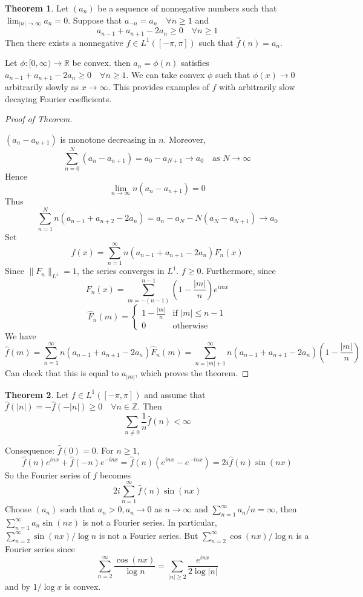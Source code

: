 \documentclass{article}
\theoremstyle{definition}
\newtheorem{thm}{Theorem}
\newenvironment{proofs}[1][\proofname]{%
  \begin{proof}[#1]$ $\par\nobreak\ignorespaces
}{%
  \end{proof}
}
\newcommand{\RR}{\mathbb R}
\newcommand{\ZZ}{\mathbb Z}
\begin{document}
\begin{thm}
	Let $(a_n)$ be a sequence of nonnegative numbers such that $\lim_{|n| \to \infty} a_n = 0$.
	Suppose that $a_{-n} = a_n \quad \forall n \geq 1$ and 
	\[
		a_{n - 1} + a_{n + 1} - 2 a_n \geq 0 \quad \forall n \geq 1
	\]
	Then there exists a nonnegative $f \in L^1([-\pi, \pi])$ such that $\hat{f}(n) = a_n$.
\end{thm}

Let $\phi:[0, \infty) \to \RR$ be convex.
then $a_n = \phi(n)$ satisfies $a_{n - 1} + a_{n + 1} - 2 a_n \geq 0 \quad \forall n \geq 1$.
We can take convex $\phi$ such that $\phi(x) \to 0$ arbitrarily slowly as $x \to \infty$.
This provides examples of $f$ with arbitrarily slow decaying Fourier coefficients.

\begin{proofs}[Proof of Theorem]
	$(a_n - a_{n + 1})$ is monotone decreasing in $n$.
	Moreover, 
	\[
		\sum_{n = 0}^N (a_n - a_{n + 1}) = a_0 - a_{N + 1} \to a_0 \quad \text{as } N \to \infty
	\]
	Hence 
	\[
		\lim_{n \to \infty} n(a_n - a_{n + 1}) = 0
	\]
	Thus 
	\[
		\sum_{n = 1}^N n(a_{n - 1} + a_{n + 2} - 2 a_n) = a_n - a_N - N (a_N - a_{N + 1}) \to a_0
	\]
	Set 
	\[
		f(x) = \sum_{n = 1}^\infty n(a_{n - 1} + a_{n + 1} - 2 a_n) F_n(x)
	\]
	Since $\|F_n\|_{L^1} = 1$, the series converges in $L^1$.
	$f \geq 0$.
	Furthermore, since
	\[
		F_n(x) = \sum_{m = -(n - 1)}^{n - 1} \left(1 - \frac{|m|}{n} \right) e^{imx}
	\]
	\[
		\hat{F}_n(m) = 
		\begin{cases}
			1 - \frac{|m|}{n} &\text{if } |m| \leq n - 1\\
			0 & \text{otherwise}
		\end{cases}
	\]
	We have
	\[
		\hat{f}(m) = \sum_{n = 1}^\infty n(a_{n - 1} + a_{n + 1} - 2 a_n) \hat{F}_n(m) = \sum_{n = |m| + 1}^\infty n(a_{n - 1} + a_{n + 1} - 2 a_n) \left( 1 - \frac{|m|}{n} \right)
	\]
	Can check that this is equal to $a_{|m|}$, which proves the theorem.
\end{proofs}

\begin{thm}
	Let $f \in L^1([-\pi, \pi])$ and assume that $\hat{f}(|n|) = -\hat{f}(-|n|) \geq 0 \quad \forall n \in \ZZ$.
	Then 
	\[
		\sum_{n \neq 0} \frac{1}{n} \hat{f}(n) < \infty
	\]
\end{thm}

Consequence: $\hat{f}(0) = 0$.
For $n \geq 1$, 
\[
	\hat{f}(n) e^{inx} + \hat{f}(-n) e^{-inx} = \hat{f}(n) (e^{inx} - e^{-inx}) = 2i \hat{f}(n) \sin (nx)
\]
So the Fourier series of $f$ becomes
\[
	2 i \sum_{n = 1}^\infty \hat{f}(n) \sin (nx)
\]
Choose $(a_n)$ such that $a_n > 0, a_n \to 0$ as $n \to \infty$ and $\sum_{n = 1}^\infty a_n/n = \infty$, then $\sum_{n = 1}^\infty a_n \sin (nx)$ is not a Fourier series.
In particular, $\sum_{n = 2}^\infty \sin (nx)/\log n$ is not a Fourier series.
But $\sum_{n= 2}^\infty \cos(nx)/\log n$ is a Fourier series since
\[
	\sum_{n = 2}^\infty \frac{\cos(nx)}{\log n} = \sum_{|n| \geq 2} \frac{e^{inx}}{2 \log |n|}
\]
and by $1/\log x$ is convex.
\end{document}
